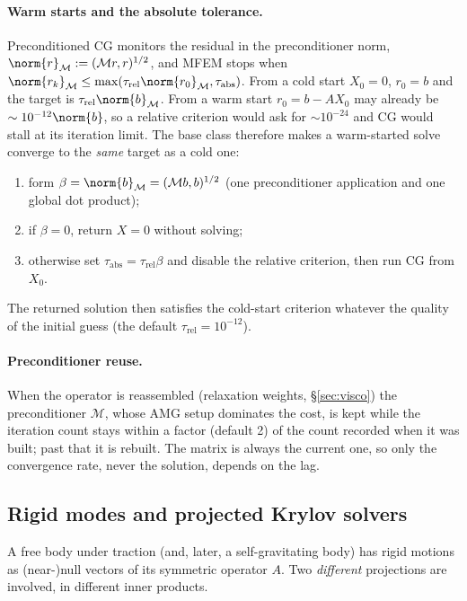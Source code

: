 \documentclass[11pt]{article}
\numberwithin{equation}{section}
\theoremstyle{remark}
\begin{document}
\paragraph{Warm starts and the absolute tolerance.} Preconditioned CG
monitors the residual in the preconditioner norm,
$\norm{r}_{\mathcal{M}} := (\mathcal{M}r, r)^{1/2}$, and MFEM stops when
$\norm{r_k}_{\mathcal{M}} \le \max(\tau_{\mathrm{rel}}\norm{r_0}_{\mathcal{M}},
\tau_{\mathrm{abs}})$. From a cold start $X_0 = 0$, $r_0 = b$ and the
target is $\tau_{\mathrm{rel}}\norm{b}_{\mathcal{M}}$. From a warm start
$r_0 = b - AX_0$ may already be $\sim10^{-12}\norm{b}$, so a relative
criterion would ask for $\sim10^{-24}$ and CG would stall at its iteration
limit. The base class therefore makes a warm-started solve converge to the
\emph{same} target as a cold one:
\begin{enumerate}
\item form $\beta = \norm{b}_{\mathcal{M}} = (\mathcal{M}b, b)^{1/2}$ (one
  preconditioner application and one global dot product);
\item if $\beta = 0$, return $X = 0$ without solving;
\item otherwise set $\tau_{\mathrm{abs}} = \tau_{\mathrm{rel}}\beta$ and
  disable the relative criterion, then run CG from $X_0$.
\end{enumerate}
The returned solution then satisfies the cold-start criterion whatever the
quality of the initial guess (the default $\tau_{\mathrm{rel}} =
10^{-12}$).

\paragraph{Preconditioner reuse.} When the operator is reassembled
(relaxation weights, \S\ref{sec:visco}) the preconditioner $\mathcal{M}$,
whose AMG setup dominates the cost, is kept while the iteration count
stays within a factor (default 2) of the count recorded when it was built;
past that it is rebuilt. The matrix is always the current one, so only the
convergence rate, never the solution, depends on the lag.

\subsection{Rigid modes and projected Krylov solvers}
\label{sec:projected}

A free body under traction (and, later, a self-gravitating body) has
rigid motions as (near-)null vectors of its symmetric operator $A$. Two
\emph{different} projections are involved, in different inner products.
\end{document}
